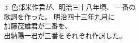 \documentclass[10pt,b5j]{tarticle} %
\begin{document}
\begin{enumerate}
\begin{minipage}[c]{\blocksize}
        \item[※]
        色部米作君が、明治三十八年頃、 一番の\\
        歌詞を作った。 明治四十三年九月に\\
        加藤茂雄君が二番を、\\
        出納陽一君が三番をそれぞれ作詞した。
    \end{minipage}
\end{enumerate} %
% 
% 
\end{document}
